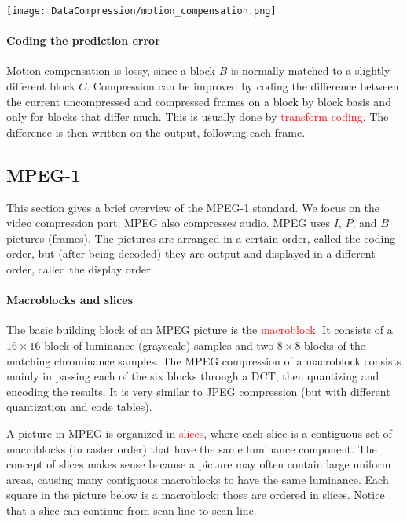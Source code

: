 \documentclass[a4paper, 11pt, openany]{book}
\numberwithin{equation}{section}
\theoremstyle{plain}
\theoremstyle{definition}
\newcommand{\Important}[1]{\textcolor{red}{#1}}
\begin{document}
\begin{center}
    \texttt{[image: DataCompression/motion\_compensation.png]}
\end{center}



\paragraph{Coding  the prediction error}
Motion compensation is lossy, since a block $B$ is normally matched to a slightly different block $C$. Compression can be improved by coding the difference between the current uncompressed and compressed frames on a block by block basis and only for blocks that differ much. This is usually done by \Important{transform coding}. The difference is then written on the output, following each frame.




\subsection{MPEG-1}

This section gives a brief overview of the MPEG-1 standard. We focus on the video compression part; MPEG also compresses audio. MPEG uses $I$, $P$, and $B$ pictures (frames). The pictures are arranged in a certain order, called the coding order, but (after being decoded) they are output and displayed in a different order, called the display order.

\paragraph{Macroblocks and slices}
The basic building block of an MPEG picture is the \Important{macroblock}. It
consists of a $16 \times 16$ block of luminance (grayscale) samples and two $8 \times 8$ blocks of the matching chrominance samples. The MPEG compression of a macroblock consists mainly in passing each of the six blocks through a DCT, then quantizing and encoding the results. It is very similar to JPEG compression (but with different quantization and code tables).

A picture in MPEG is organized in \Important{slices}, where each slice is a contiguous set of
macroblocks (in raster order) that have the same luminance component. The concept of slices makes sense because a picture may often contain large uniform areas, causing many contiguous macroblocks to have the same luminance. Each square in the picture below is a macroblock; those are ordered in slices. Notice that a slice can continue from scan line to scan line.
\end{document}
